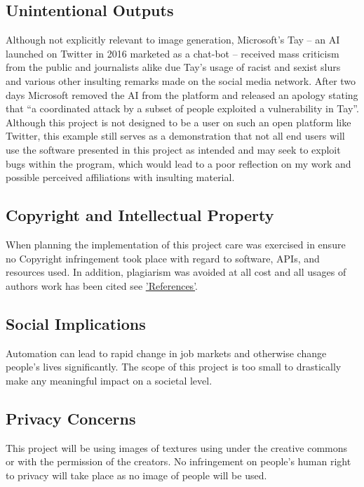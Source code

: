 \subsection{Unintentional Outputs}
\label{unintentionaloutputs}
\noindent Although not explicitly relevant to image generation, Microsoft’s Tay – an AI launched on Twitter in 2016 marketed as a chat-bot – received mass criticism from the public and journalists alike due Tay’s usage of racist and sexist slurs and various other insulting remarks made on the social media network. After two days Microsoft removed the AI from the platform and released an apology stating that “a coordinated attack by a subset of people exploited a vulnerability in Tay”\cite{microsofttay}. Although this project is not designed to be a user on such an open platform like Twitter, this example still serves as a demonstration that not all end users will use the software presented in this project as intended and may seek to exploit bugs within the program, which would lead to a poor reflection on my work and possible perceived affiliations with insulting material.

\subsection{Copyright and Intellectual Property}
\label{subsec:copyrightandintellectualpropery}
When planning the implementation of this project care was exercised in ensure no Copyright infringement took place with regard to software, APIs, and resources used. In addition, plagiarism was avoided at all cost and all usages of authors work has been cited see \hyperref[refs]{'References'}.

\subsection{Social Implications}
\label{subsec:socialimplications}
Automation can lead to rapid change in job markets and otherwise change people's lives significantly. The scope of this project is too small to drastically make any meaningful impact on a societal level.

\subsection{Privacy Concerns}
\label{subsec:privacyconcerns}
This project will be using images of textures using under the creative commons or with the permission of the creators. No infringement on people's human right to privacy will take place as no image of people will be used.